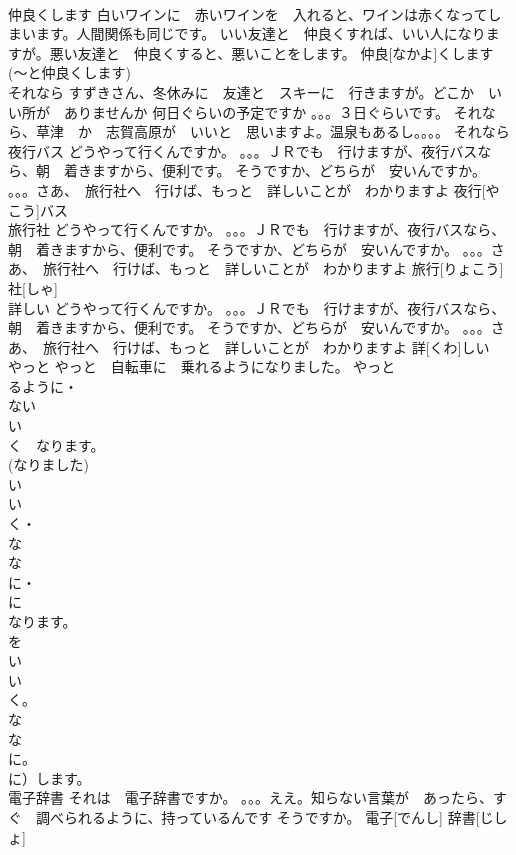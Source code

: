 \documentclass[8pt]{extreport}
\begin{document}
\begin{CJK}{UTF8}{min}
\\	仲良くします	白いワインに　赤いワインを　入れると、ワインは赤くなってしまいます。人間関係も同じです。 いい友達と　仲良くすれば、いい人になりますが。悪い友達と　仲良くすると、悪いことをします。	仲良[なかよ]くします			
\\	(～と仲良くします)		
\\	それなら	すずきさん、冬休みに　友達と　スキーに　行きますが。どこか　いい所が　ありませんか 何日ぐらいの予定ですか 。。。３日ぐらいです。 それなら、草津　か　志賀高原が　いいと　思いますよ。温泉もあるし。。。。	それなら			
\\	夜行バス	どうやって行くんですか。 。。。ＪＲでも　行けますが、夜行バスなら、朝　着きますから、便利です。 そうですか、どちらが　安いんですか。 。。。さあ、　旅行社へ　行けば、もっと　詳しいことが　わかりますよ	夜行[やこう]バス			
\\	旅行社	どうやって行くんですか。 。。。ＪＲでも　行けますが、夜行バスなら、朝　着きますから、便利です。 そうですか、どちらが　安いんですか。 。。。さあ、　旅行社へ　行けば、もっと　詳しいことが　わかりますよ	旅行[りょこう] 社[しゃ]			
\\	詳しい	どうやって行くんですか。 。。。ＪＲでも　行けますが、夜行バスなら、朝　着きますから、便利です。 そうですか、どちらが　安いんですか。 。。。さあ、　旅行社へ　行けば、もっと　詳しいことが　わかりますよ	詳[くわ]しい			
\\	やっと	やっと　自転車に　乗れるようになりました。	やっと			
\\	るように・
\\	ない
\\	い　
\\	く　なります。
\\	(なりました) 
\\	い
\\	い
\\	く・
\\	な
\\	な
\\	に・
\\	に　
\\	なります。
\\	を
\\	い
\\	い
\\	く。
\\	な
\\	な
\\	に。
\\	に）します。
\\	電子辞書	それは　電子辞書ですか。 。。。ええ。知らない言葉が　あったら、すぐ　調べられるように、持っているんです そうですか。	電子[でんし] 辞書[じしょ]			

\end{CJK}
\end{document}
